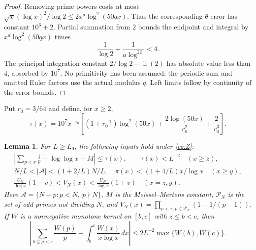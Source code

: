 \documentclass[11pt]{article}
\newtheorem{lemma}[theorem]{Lemma}
\theoremstyle{remark}\newtheorem{remark}[theorem]{Remark}
\newcommand{\A}{\mathcal A}
\newcommand{\PP}{\mathcal P_N}
\newcommand{\li}{\operatorname{li}}
\begin{document}
\begin{proof}
Removing prime powers costs at most
$\sqrt{x}(\log x)^2/\log2\le2x^a\log^2(50qx)$.
Thus the corresponding $\theta$ error has constant $10^6+2$.
Partial summation from $2$ bounds the endpoint and integral by
$x^a\log^2(50qx)$ times
\[
\frac1{\log2}+\frac1{a\log^22}<4.
\]
The principal integration constant $2/\log2-\li(2)$ has absolute
value less than $4$, absorbed by $10^7$.
No primitivity has been assumed: the periodic sum and omitted Euler
factors use the actual modulus $q$. Left limits follow by continuity
of the error bounds.
\end{proof}

Put $r_0=3/64$ and define, for $x\ge2$,
\begin{equation}\label{eq:tail}
\tau(x)=10^7x^{-r_0}\left[
(1+r_0^{-1})\log^2(50x)+\frac{2\log(50x)}{r_0^2}+\frac2{r_0^3}\right].
\end{equation}
\begin{lemma}\label{lem:primeinputs}
For $L\ge L_0$, the following inputs hold under \eqref{eq:Z}:
\begin{gather*}
\left|\sum_{p<x}\frac1p-\log\log x-M\right|\le\tau(x),\qquad
\tau(x)<L^{-2}\quad(x\ge z),\\
N/L<|\A|<(1+2/L)N/L,\quad
\pi(x)<(1+4/L)x/\log x\quad(x\ge y),\\
\frac{U_N}{\log x}(1-v)<V_N(x)<\frac{U_N}{\log x}(1+v)
\quad(x=z,y).
\end{gather*}
Here $\A=\{N-p:p<N,\ p\nmid N\}$, $M$ is the Meissel--Mertens constant,
$\PP$ is the set of odd primes not dividing $N$, and
$V_N(x)=\prod_{p<x,p\in\PP}(1-1/(p-1))$.
If $W$ is a nonnegative monotone kernel on $[b,c]$ with $z\le b<c$,
then
\begin{equation}\label{eq:weighted}
\left|\sum_{b\le p<c}\frac{W(p)}p
-\int_b^c\frac{W(x)}{x\log x}\,dx\right|
\le 2L^{-2}\max\{W(b),W(c)\}.
\end{equation}
\end{lemma}
\end{document}
